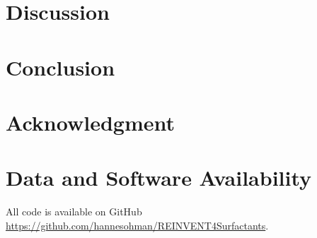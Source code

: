 \documentclass[11pt]{aime}
\begin{document}
\section{Discussion}
\label{sec:discussion}


\section{Conclusion}
\label{sec:conclusion}


\section*{Acknowledgment}

\section*{Data and Software Availability}
All code is available on GitHub \url{https://github.com/hannesohman/REINVENT4Surfactants}.




\end{document}
